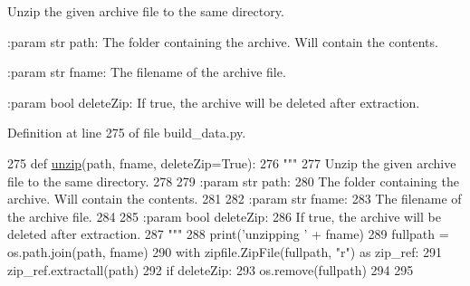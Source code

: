 \begin{DoxyVerb}Unzip the given archive file to the same directory.

:param str path:
    The folder containing the archive. Will contain the contents.

:param str fname:
    The filename of the archive file.

:param bool deleteZip:
    If true, the archive will be deleted after extraction.
\end{DoxyVerb}
 

Definition at line 275 of file build\+\_\+data.\+py.


\begin{DoxyCode}
275 \textcolor{keyword}{def }\hyperlink{namespaceparlai_1_1core_1_1build__data_a7cbfdf246ca40dc3ed9f8613deb14a00}{unzip}(path, fname, deleteZip=True):
276     \textcolor{stringliteral}{"""}
277 \textcolor{stringliteral}{    Unzip the given archive file to the same directory.}
278 \textcolor{stringliteral}{}
279 \textcolor{stringliteral}{    :param str path:}
280 \textcolor{stringliteral}{        The folder containing the archive. Will contain the contents.}
281 \textcolor{stringliteral}{}
282 \textcolor{stringliteral}{    :param str fname:}
283 \textcolor{stringliteral}{        The filename of the archive file.}
284 \textcolor{stringliteral}{}
285 \textcolor{stringliteral}{    :param bool deleteZip:}
286 \textcolor{stringliteral}{        If true, the archive will be deleted after extraction.}
287 \textcolor{stringliteral}{    """}
288     print(\textcolor{stringliteral}{'unzipping '} + fname)
289     fullpath = os.path.join(path, fname)
290     with zipfile.ZipFile(fullpath, \textcolor{stringliteral}{"r") as zip\_ref:}
291 \textcolor{stringliteral}{        zip\_ref.extractall(path)}
292 \textcolor{stringliteral}{    }\textcolor{keywordflow}{if} deleteZip:
293         os.remove(fullpath)
294 
295 
\end{DoxyCode}
